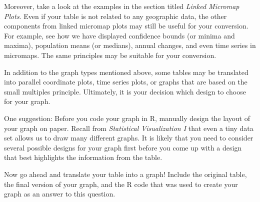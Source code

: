 \documentclass[12pt,letterpaper,final]{article}
\begin{document}
\begin{enumerate}
\begin{enumerate}
Moreover, take a look at the examples in the section titled {\it Linked Micromap Plots}.
Even if your table is not related to any geographic data, the other
components from linked micromap plots may still be useful for your conversion.
For example, see how we have displayed confidence bounds (or minima and maxima),
population means (or medians), annual changes, and even time series in micromaps.
The same principles may be suitable for your conversion.

In addition to the graph types mentioned above, some tables may be
translated into parallel coordinate plots, time series plots, or 
graphs that are based on the small multiples principle.
Ultimately, it is your decision which design to choose for your graph.

One suggestion: Before you code your graph in R, manually design the layout 
of your graph on paper. 
Recall from {\it Statistical Visualization I}
that even a tiny data set allows us to draw many different graphs. 
It is likely that you need to consider several possible designs for your graph
first before you come up with a design that best highlights the information
from the table. 

Now go ahead and translate your table into a graph!
Include the original table, the final
version of your graph, and the R code that was used to create your graph
as an answer to this question.\\


\end{enumerate}
\end{enumerate}
\end{document}
